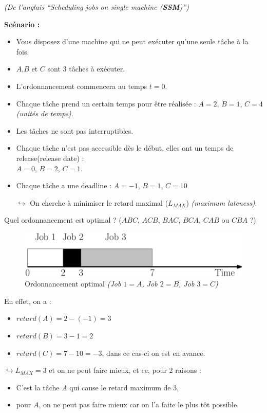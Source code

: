 \documentclass{article}
\begin{document}
\begin{sffamily}
\begin{flushright}
\textit{(De l'anglais ``Scheduling jobs on single machine (\textbf{SSM})'')}
\end{flushright}
\textbf{Scénario :}
\begin{itemize}
\item Vous disposez d'une machine qui ne peut exécuter qu'une seule tâche à la
fois.
\item $A$,$B$ et $C$ sont $3$ tâches à exécuter.
\item L'ordonnancement commencera au temps $t = 0$.
\item Chaque tâche prend un certain temps pour être réalisée : $A = 2$, $B = 1$,
$C = 4$ \textit{(unités de temps)}.
\item Les tâches ne sont pas interruptibles.
\item Chaque tâche n'est pas accessible dès le début, elles ont un temps de
release(release date) :\\ $A = 0$, $B = 2$, $C = 1$.
\item Chaque tâche a une deadline : $A = -1$, $B = 1$, $C = 10$
\item[$\hookrightarrow$] On cherche à minimiser le retard maximal ($L_{MAX}$)
\textit{(maximum lateness)}.
\end{itemize}

Quel ordonnancement est optimal ? ($ABC$, $ACB$, $BAC$, $BCA$, $CAB$ ou $CBA$ ?)

\begin{figure}[h!]
    \begin{center}
    \includegraphics[scale=0.2]{ordo.pdf}
    \caption{Ordonnancement optimal \textit{(Job $1 = A$, Job $2 = B$,
    Job $3 = C$)}}
    \end{center}
\end{figure}
\noindent En effet, on a :
\begin{itemize}
\item $retard(A) = 2 - (-1) = 3$
\item $retard(B) = 3 - 1 = 2$
\item $retard(C) = 7 - 10 = -3$, dans ce cas-ci on est en avance.
\end{itemize}

$\hookrightarrow L_{MAX} = 3$ et on ne peut faire mieux, et ce, pour 2 raisons :
\begin{itemize}
\item C'est la tâche $A$ qui cause le retard maximum de $3$,
\item pour $A$, on ne peut pas faire mieux car on l'a faite le plus tôt
possible.
\end{itemize}


\end{sffamily}
\end{document}
